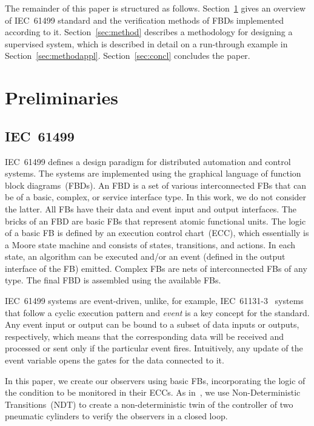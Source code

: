 \begin{bibunit}
The remainder of this paper is structured as follows. Section~\ref{sec:prelim} gives an overview of IEC~61499 standard and the verification methods of FBDs implemented according to it. Section~\ref{sec:method} describes a methodology for designing a supervised system, which is described in detail on a run-through example in Section~\ref{sec:methodappl}. Section~\ref{sec:concl} concludes the paper.

\section{Preliminaries}
\label{sec:prelim}
\subsection{IEC~61499}
IEC~61499 defines a design paradigm for distributed automation and control systems. The systems are implemented using the graphical language of function block diagrams~(FBDs). An FBD is a set of various interconnected FBs that can be of a basic, complex, or service interface type. In this work, we do not consider the latter. All FBs have their data and event input and output interfaces. The bricks of an FBD are basic FBs that represent atomic functional units. The logic of a basic FB is defined by an execution control chart~(ECC), which essentially is a Moore state machine and consists of states, transitions, and actions. In each state, an algorithm can be executed and/or an event (defined in the output interface of the FB) emitted. Complex FBs are nets of interconnected FBs of any type. The final FBD is assembled using the available FBs.

IEC~61499 systems are event-driven, unlike, for example, \mbox{IEC~61131-3}~\cite{tiegelkamp1995iec} systems that follow a cyclic execution pattern and \emph{event} is a key concept for the standard. Any event input or output can be bound to a subset of data inputs or outputs, respectively, which means that the corresponding data will be received and processed or sent only if the particular event fires. Intuitively, any update of the event variable opens the gates for the data connected to it.

In this paper, we create our observers using basic FBs, incorporating the logic of the condition to be monitored in their ECCs. As in~\cite{toolchain}, we use Non-Deterministic Transitions~(NDT) to create a non-deterministic twin of the controller of two pneumatic cylinders to verify the observers in a closed loop.


\end{bibunit}
